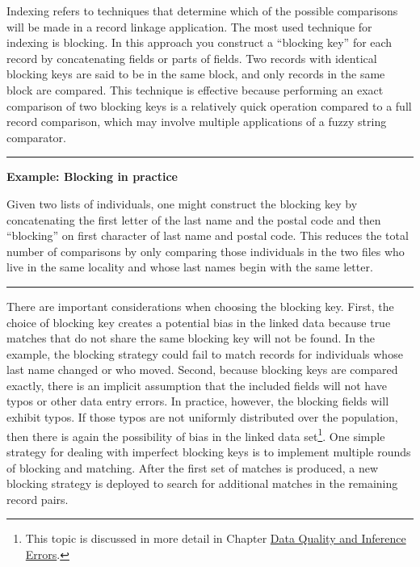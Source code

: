 \documentclass[]{krantz}
\begin{document}
Indexing refers to techniques that determine which of the possible
comparisons will be made in a record linkage application. The most used
technique for indexing is blocking. In this approach you construct a
``blocking key'' for each record by concatenating fields or parts of
fields. Two records with identical blocking keys are said to be in the
same block, and only records in the same block are compared. This
technique is effective because performing an exact comparison of two
blocking keys is a relatively quick operation compared to a full record
comparison, which may involve multiple applications of a fuzzy string
comparator.

\begin{center}\rule{0.5\linewidth}{\linethickness}\end{center}

\textbf{Example: Blocking in practice}

Given two lists of individuals, one might construct the blocking key by
concatenating the first letter of the last name and the postal code and
then ``blocking'' on first character of last name and postal code. This
reduces the total number of comparisons by only comparing those
individuals in the two files who live in the same locality and whose
last names begin with the same letter.

\begin{center}\rule{0.5\linewidth}{\linethickness}\end{center}

There are important considerations when choosing the blocking key.
First, the choice of blocking key creates a potential bias in the linked
data because true matches that do not share the same blocking key will
not be found. In the example, the blocking strategy could fail to match
records for individuals whose last name changed or who moved. Second,
because blocking keys are compared exactly, there is an implicit
assumption that the included fields will not have typos or other data
entry errors. In practice, however, the blocking fields will exhibit
typos. If those typos are not uniformly distributed over the population,
then there is again the possibility of bias in the linked data
set\footnote{This topic is discussed in more detail in Chapter
  \protect\hyperlink{chap:errors}{Data Quality and Inference Errors}.}.
One simple strategy for dealing with imperfect blocking keys is to
implement multiple rounds of blocking and matching. After the first set
of matches is produced, a new blocking strategy is deployed to search
for additional matches in the remaining record pairs.
\end{document}
